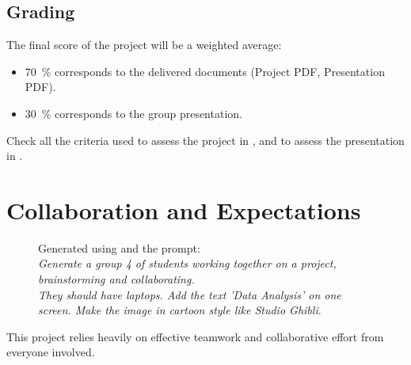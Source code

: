 \documentclass[11pt]{exam}
\begin{document}
    \subsection{Grading}
    The final score of the project will be a weighted average:
    \begin{itemize}
        \item \SI{70}{\percent} corresponds to the delivered documents (Project PDF, Presentation PDF).
        \item \SI{30}{\percent} corresponds to the group presentation.
    \end{itemize}
    Check all the criteria used to assess the project in , and to assess the presentation in .

    \newpage
    \section{Collaboration and Expectations}
    \begin{figure}
        \vspace{-12pt}
        \centering
        \caption{Generated using \href{https://gemini.google.com/}{} and the prompt:\\[4pt]
            \emph{Generate a group 4 of students working together on a project, brainstorming and collaborating.\\[4pt]
                They should have laptops. Add the text 'Data Analysis' on one screen. Make the image in cartoon style like Studio Ghibli}.}
        \vspace{-75pt}
        \label{fig:collaboration}
    \end{figure}
    This project relies heavily on effective teamwork and collaborative effort from everyone involved.
\end{document}

